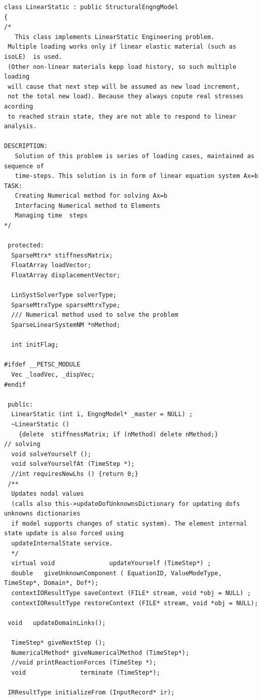 \documentclass[a4paper]{article}
\begin{document}
{\small\begin{verbatim}
class LinearStatic : public StructuralEngngModel
{ 
/*
   This class implements LinearStatic Engineering problem.
 Multiple loading works only if linear elastic material (such as isoLE)  is used.
 (Other non-linear materials kepp load history, so such multiple loading
 will cause that next step will be assumed as new load increment, 
 not the total new load). Because they always copute real stresses acording
 to reached strain state, they are not able to respond to linear analysis.
  
DESCRIPTION:
   Solution of this problem is series of loading cases, maintained as sequence of
   time-steps. This solution is in form of linear equation system Ax=b
TASK:
   Creating Numerical method for solving Ax=b
   Interfacing Numerical method to Elements
   Managing time  steps
*/

 protected:
  SparseMtrx* stiffnessMatrix;
  FloatArray loadVector;
  FloatArray displacementVector;
  
  LinSystSolverType solverType;
  SparseMtrxType sparseMtrxType;
  /// Numerical method used to solve the problem
  SparseLinearSystemNM *nMethod;

  int initFlag;

#ifdef __PETSC_MODULE
  Vec _loadVec, _dispVec;
#endif

 public:
  LinearStatic (int i, EngngModel* _master = NULL) ;
  ~LinearStatic () 
    {delete  stiffnessMatrix; if (nMethod) delete nMethod;}
// solving
  void solveYourself ();
  void solveYourselfAt (TimeStep *);
  //int requiresNewLhs () {return 0;}
 /**
  Updates nodal values
  (calls also this->updateDofUnknownsDictionary for updating dofs unknowns dictionaries
  if model supports changes of static system). The element internal state update is also forced using
  updateInternalState service.
  */
  virtual void               updateYourself (TimeStep*) ;
  double   giveUnknownComponent ( EquationID, ValueModeType, TimeStep*, Domain*, Dof*);
  contextIOResultType saveContext (FILE* stream, void *obj = NULL) ;
  contextIOResultType restoreContext (FILE* stream, void *obj = NULL);

 void   updateDomainLinks();

  TimeStep* giveNextStep ();
  NumericalMethod* giveNumericalMethod (TimeStep*);
  //void printReactionForces (TimeStep *);
  void               terminate (TimeStep*);

 IRResultType initializeFrom (InputRecord* ir);


\end{verbatim}}
\end{document}
